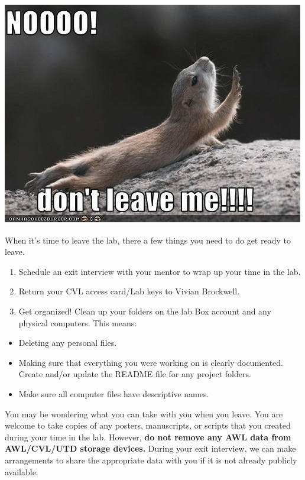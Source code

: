 \documentclass[
]{book}
\providecommand{\tightlist}{%
  \setlength{\itemsep}{0pt}\setlength{\parskip}{0pt}}
\begin{document}
\includegraphics{images/leave.png}

When it's time to leave the lab, there a few things you need to do get ready to leave.

\begin{enumerate}
\def\labelenumi{(\arabic{enumi})}
\tightlist
\item
  Schedule an exit interview with your mentor to wrap up your time in the lab.
\item
  Return your CVL access card/Lab keys to Vivian Brockwell.
\item
  Get organized! Clean up your folders on the lab Box account and any physical computers. This means:
\end{enumerate}

\begin{itemize}
\tightlist
\item
  Deleting any personal files.
\item
  Making sure that everything you were working on is clearly documented. Create and/or update the README file for any project folders.
\item
  Make sure all computer files have descriptive names.
\end{itemize}

You may be wondering what you can take with you when you leave. You are welcome to take copies of any posters, manuscripts, or scripts that you created during your time in the lab. However, \textbf{do not remove any AWL data from AWL/CVL/UTD storage devices.} During your exit interview, we can make arrangements to share the appropriate data with you if it is not already publicly available.
\end{document}

